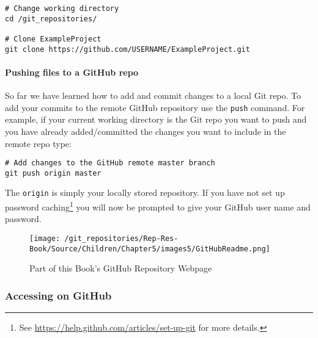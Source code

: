 \begin{knitrout}
\color{fgcolor}\begin{kframe}
\begin{verbatim}
# Change working directory 
cd /git_repositories/

# Clone ExampleProject
git clone https://github.com/USERNAME/ExampleProject.git
\end{verbatim}
\end{kframe}
\end{knitrout}


\paragraph{Pushing files to a GitHub repo}

So far we have learned how to add and commit changes to a local Git repo. To add your commits to the remote GitHub repository use the \texttt{push} command. For example, if your current working directory is the Git repo you want to push and you have already added/committed the changes you want to include in the remote repo type:

\begin{knitrout}
\color{fgcolor}\begin{kframe}
\begin{verbatim}
# Add changes to the GitHub remote master branch
git push origin master
\end{verbatim}
\end{kframe}
\end{knitrout}


\noindent The \texttt{origin} is simply your locally stored repository. If you have not set up password caching\footnote{See \url{https://help.github.com/articles/set-up-git} for more details.} you will now be prompted to give your GitHub user name and password.

\begin{figure}[t]
    \caption{Part of this Book's GitHub Repository Webpage}
    \label{BookRepository}
    \begin{center}
    \texttt{[image: /git\_repositories/Rep-Res-Book/Source/Children/Chapter5/images5/GitHubReadme.png]}
    \end{center}
\end{figure}

\subsubsection{Accessing on GitHub}

